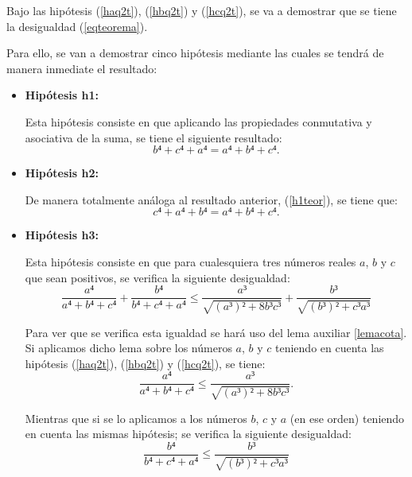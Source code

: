 \begin{demostracion}
  Bajo las hipótesis (\ref{haq2t}), (\ref{hbq2t}) y (\ref{hcq2t}), se va a
  demostrar que se tiene la desigualdad (\ref{eqteorema}).

  Para ello, se van a demostrar cinco hipótesis mediante las cuales se
  tendrá de manera inmediate el resultado:
  \begin{itemize}
  \item \textbf{Hipótesis h1:}

    Esta hipótesis consiste en que aplicando las propiedades conmutativa
    y asociativa de la suma, se tiene el siguiente resultado:
    \begin{equation}\label{h1teor}\tag{h1}
      b⁴+c⁴+a⁴=a⁴+b⁴+c⁴.
    \end{equation}

  \item \textbf{Hipótesis h2:}

    De manera totalmente análoga al resultado anterior, (\ref{h1teor}), se
    tiene que:
    \begin{equation}\label{h2teor}\tag{h2}
      c⁴+a⁴+b⁴=a⁴+b⁴+c⁴.
    \end{equation}

  \item \textbf{Hipótesis h3:}

    Esta hipótesis consiste en que para cualesquiera tres números reales
    \(a\), \(b\) y \(c\) que sean positivos, se verifica la siguiente
    desigualdad:
    \begin{equation}\label{h3teor}\tag{h3}
      \frac{a⁴}{a⁴+b⁴+c⁴}+\frac{b⁴}{b⁴+c⁴+a⁴}≤
      \frac{a³}{\sqrt{(a³)²+8b³c³}}+\frac{b³}{\sqrt{(b³)²+c³a³}}
    \end{equation}

    Para ver que se verifica esta igualdad se hará uso del lema auxiliar
    \ref{lemacota}. Si aplicamos dicho lema sobre los números \(a\), \(b\)
    y \(c\) teniendo en cuenta las hipótesis (\ref{haq2t}), (\ref{hbq2t})
    y (\ref{hcq2t}), se tiene:
    \begin{equation}\label{h3teor1}
      \frac{a⁴}{a⁴+b⁴+c⁴}≤
      \frac{a³}{\sqrt{(a³)²+8b³c³}}.
    \end{equation}

    Mientras que si se lo aplicamos a los números \(b\), \(c\) y \(a\) (en
    ese orden) teniendo en cuenta las mismas hipótesis; se verifica la
    siguiente desigualdad:
    \begin{equation}\label{h3teor2}
      \frac{b⁴}{b⁴+c⁴+a⁴}≤\frac{b³}{\sqrt{(b³)²+c³a³}}
    \end{equation}


\end{itemize}
\end{demostracion}
